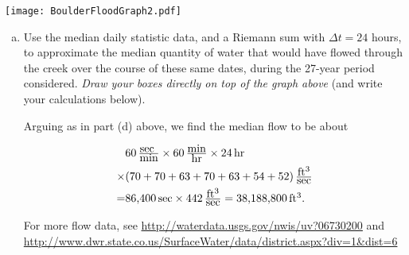 \documentclass[12pt]{article}
\def\Red{\color{red}}
\def\Black{\color{black}}
\def\Red{\color{white}}
\def\Black{\color{black}}
\begin{document}
\begin{center}
\texttt{[image: BoulderFloodGraph2.pdf]}
\end{center}
\begin{enumerate}[(a)]\addtocounter{enumi}{4}
\item Use the median daily statistic data, and a Riemann sum with $\Delta t = 24$ hours, to approximate the median quantity of water that would have flowed through the creek over the course of these same dates, during the 27-year period considered. {\it Draw your boxes directly on top of the graph above} (and write your calculations below).

\Red Arguing as in part (d) above, we find the median flow to be about

\begin{align*} & 60\,  {\textstyle\frac{\hbox{sec }}{\hbox{min}}}\times 60\, {\textstyle\frac{\hbox{min}}{\hbox{hr}}}\times24\, \hbox{hr}\\\times &(70+70 +63+70+63+54+52) \,{\textstyle\frac{\hbox{ft$^3$}}{\hbox{sec}}}
\\=& \hbox{86,400}\, \hbox{sec} \times 442\,{\textstyle\frac{\hbox{ft$^3$}}{\hbox{sec}}}  =\hbox{38,188,800}\, \hbox{ft$^3$}.\end{align*} 

\vfill\Black

For more flow data, see \url{http://waterdata.usgs.gov/nwis/uv?06730200} and \\ \url{http://www.dwr.state.co.us/SurfaceWater/data/district.aspx?div=1&dist=6}

\end{enumerate}
\end{document}
